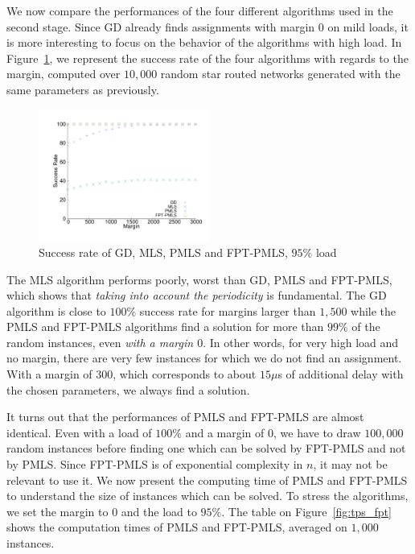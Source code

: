 \documentclass[a4paper,10pt]{article}
\begin{document}
      We now compare the performances of the four different algorithms used in the second stage. Since GD already finds assignments with margin $0$ on mild loads, it is more interesting to focus on the behavior of the algorithms with high load. In Figure~\ref{fig:success21000}, we represent the success rate of the four algorithms with regards to the margin,  computed over $10,000$ random star routed networks generated with the same parameters as previously. 
     
    \begin{figure} [h] 
       \begin{center}
      \includegraphics[width=0.5\textwidth]{retour_21000.pdf}
      \end{center}
      \caption{Success rate of GD, MLS, PMLS and FPT-PMLS, $95\%$ load}
     \label{fig:success21000}
     \end{figure}
     
      The MLS algorithm performs poorly, worst than GD, PMLS and FPT-PMLS, which shows that \emph{taking into account the periodicity} is fundamental.
     The GD algorithm is close to $100\%$ success rate for margins larger than $1,500$ while the PMLS and FPT-PMLS algorithms find a solution for more than $99\%$ of the random instances, even \emph{with a margin $0$}. In other words, for very high load and no margin, there are very few instances for which we do not find an assignment. With a margin of $300$, which corresponds to about $15\mu$s of additional delay with the chosen parameters, we always find a solution. 
     
     It turns out that the performances of PMLS and FPT-PMLS 
     are almost identical. Even with a load of $100\%$ and a margin of $0$, we have to draw $100,000$ random instances before finding one which can be solved by FPT-PMLS and not by PMLS. Since FPT-PMLS is of exponential complexity in $n$, it may not be relevant to use it. We now present the computing time of PMLS and FPT-PMLS to understand the size of instances which can be solved. To stress the algorithms, we set the margin to $0$ and the load to $95\%$. The table on Figure~\ref{fig:tps_fpt} shows the computation times of PMLS and  FPT-PMLS, averaged on $1,000$ instances. 
\end{document}
